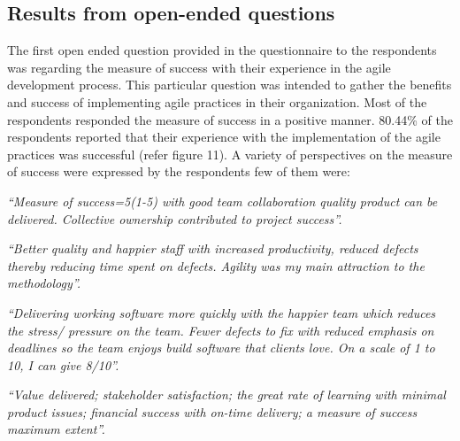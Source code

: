 \documentclass[a4paper,oneside]{bth}
\begin{document}
\subsection{Results from open-ended questions}
The first open ended question provided in the questionnaire to the respondents was regarding the measure of success with their experience in the agile development process. This particular question was intended to gather the benefits and success of implementing agile practices in their organization. Most of the respondents responded the measure of success in a positive manner. 80.44\% of the respondents reported that their experience with the implementation of the agile practices was successful (refer figure 11). A variety of perspectives on the measure of success were expressed by the respondents few of them were:

\textit{“Measure of success=5(1-5) with good team collaboration quality product can be delivered. Collective ownership contributed to project success”.}

\textit{“Better quality and happier staff with increased productivity, reduced defects thereby reducing time spent on defects. Agility was my main attraction to the methodology”.}

\textit{“Delivering working software more quickly with the happier team which reduces the stress/ pressure on the team. Fewer defects to fix with reduced emphasis on deadlines so the team enjoys build software that clients love. On a scale of 1 to 10, I can give 8/10”.}

\textit{“Value delivered; stakeholder satisfaction; the great rate of learning with minimal product issues; financial success with on-time delivery; a measure of success maximum extent”.}
\end{document}
